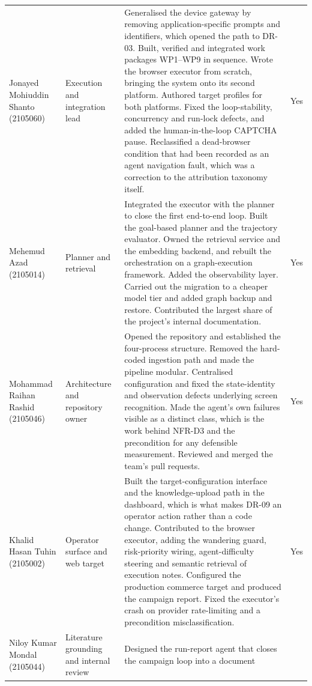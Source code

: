 \begin{xltabular}{\textwidth}{@{}>{\hsize}Y>{\hsize}Y>{\hsize}Y>{\hsize}Y@{}}
  Jonayed Mohiuddin Shanto (2105060) &
    Execution and integration lead &
    Generalised the device gateway by removing application-specific prompts and identifiers, which opened the path to DR-03. Built, verified and integrated work packages WP1--WP9 in sequence. Wrote the browser executor from scratch, bringing the system onto its second platform. Authored target profiles for both platforms. Fixed the loop-stability, concurrency and run-lock defects, and added the human-in-the-loop CAPTCHA pause. Reclassified a dead-browser condition that had been recorded as an agent navigation fault, which was a correction to the attribution taxonomy itself. &
    Yes \\
  \addlinespace
  Mehemud Azad (2105014) &
    Planner and retrieval &
    Integrated the executor with the planner to close the first end-to-end loop. Built the goal-based planner and the trajectory evaluator. Owned the retrieval service and the embedding backend, and rebuilt the orchestration on a graph-execution framework. Added the observability layer. Carried out the migration to a cheaper model tier and added graph backup and restore. Contributed the largest share of the project's internal documentation. &
    Yes \\
  \addlinespace
  Mohammad Raihan Rashid (2105046) &
    Architecture and repository owner &
    Opened the repository and established the four-process structure. Removed the hard-coded ingestion path and made the pipeline modular. Centralised configuration and fixed the state-identity and observation defects underlying screen recognition. Made the agent's own failures visible as a distinct class, which is the work behind NFR-D3 and the precondition for any defensible measurement. Reviewed and merged the team's pull requests. &
    Yes \\
  \addlinespace
  Khalid Hasan Tuhin (2105002) &
    Operator surface and web target &
    Built the target-configuration interface and the knowledge-upload path in the dashboard, which is what makes DR-09 an operator action rather than a code change. Contributed to the browser executor, adding the wandering guard, risk-priority wiring, agent-difficulty steering and semantic retrieval of execution notes. Configured the production commerce target and produced the campaign report. Fixed the executor's crash on provider rate-limiting and a precondition misclassification. &
    Yes \\
  \addlinespace
  Niloy Kumar Mondal (2105044) &
    Literature grounding and internal review &
    Designed the run-report agent that closes the campaign loop into a document

\end{xltabular}
